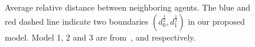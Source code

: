 \begin{figure}[H]
  \centering
  \quad
  \caption{Average relative distance between neighboring agents. The blue and red dashed line indicate two boundaries $(d_0^{\frac{1}{2}}, d_1^{\frac{1}{2}})$ in our proposed model. Model 1, 2 and 3 are from~\cite{Vicsek1995},\cite{CuckerSmale2007} and \cite{CuckerDong2010} respectively.}\label{fig:N_dis}
\end{figure}

